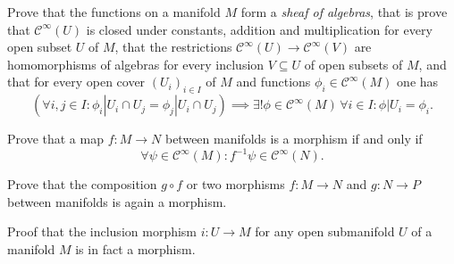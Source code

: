 \begin{xca}
  Prove that the functions on a manifold $M$ form a \emph{sheaf of algebras},
  that is prove that $\mathcal C^\infty(U)$ is closed under constants,
  addition and multiplication for every open subset $U$ of $M$, that the restrictions
  $\mathcal C^\infty(U) \to \mathcal C^\infty(V)$ are homomorphisms of algebras
  for every inclusion $V \subseteq U$ of open subsets of $M$, and that 
  for every open cover $(U_i)_{i \in I}$ of $M$ and functions
  $\phi_i \in \mathcal C^\infty(M)$ one has
  \[
    \left(\forall i, j \in I : \phi_i|U_i \cap U_j = \phi_j|U_i \cap U_j\right)
    \implies \exists! \phi \in \mathcal C^\infty(M) \, \forall i \in I :
    \phi|U_i = \phi_i.
  \]
\end{xca}

\begin{xca}
  Prove that a map $f\colon M \to N$ between manifolds is a morphism if and only if
  \[
    \forall \psi \in \mathcal C^\infty(M):
    f^{-1} \psi \in \mathcal C^\infty(N).
  \]
\end{xca}

\begin{xca}
  Prove that the composition $g \circ f$ or two morphisms $f\colon M \to N$
  and $g\colon N \to P$ between manifolds is again a morphism.
\end{xca}

\begin{xca}
  Proof that the inclusion morphism $i\colon U \to M$ for any open submanifold
  $U$ of a manifold $M$ is in fact a morphism.
\end{xca}

